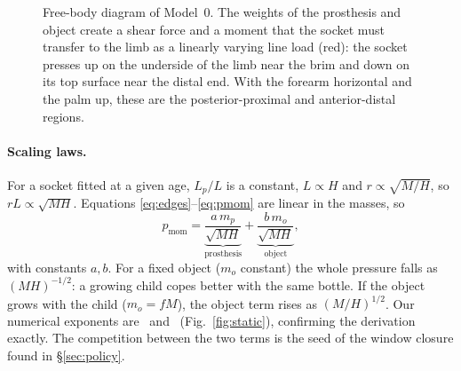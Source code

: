 \documentclass[11pt]{article}
\begin{document}
\begin{figure}[t]\centering
{}
\caption{Free-body diagram of Model~0. The weights of the prosthesis and object create a shear force and a moment that the socket must transfer to the limb as a linearly varying line load (red): the socket presses up on the underside of the limb near the brim and down on its top surface near the distal end. With the forearm horizontal and the palm up, these are the posterior-proximal and anterior-distal regions.}
\label{fig:fbd}
\end{figure}

\paragraph{Scaling laws.} For a socket fitted at a given age, $L_p/L$ is a constant, $L\propto H$ and $r\propto\sqrt{M/H}$, so $rL\propto\sqrt{MH}$. Equations \eqref{eq:edges}--\eqref{eq:pmom} are linear in the masses, so
\begin{equation}
p_{\mathrm{mom}}=\underbrace{\frac{a\,m_p}{\sqrt{MH}}}_{\text{prosthesis}}+\underbrace{\frac{b\,m_o}{\sqrt{MH}}}_{\text{object}},
\end{equation}
with constants $a,b$. For a fixed object ($m_o$ constant) the whole pressure falls as $(MH)^{-1/2}$: a growing child copes better with the same bottle. If the object grows with the child ($m_o=fM$), the object term rises as $(M/H)^{1/2}$. Our numerical exponents are \slopeFixed\ and \slopeObject\ (Fig.~\ref{fig:static}), confirming the derivation exactly. The competition between the two terms is the seed of the window closure found in \S\ref{sec:policy}.
\end{document}
